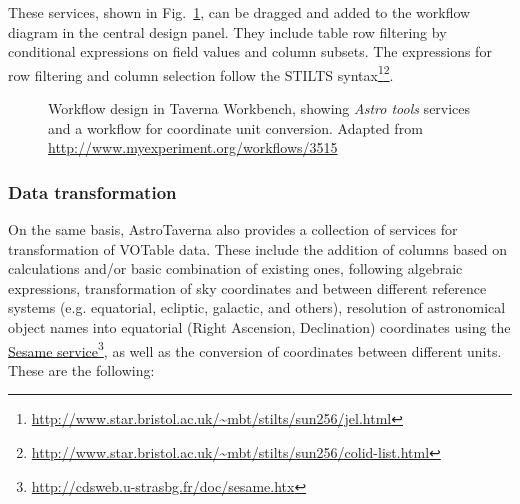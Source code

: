 \documentclass{aa}
\newcommand{\urlsamefont}[1]{\urlstyle{same}\url{#1}}
\newcommand{\hrefnote}[2]{\href{#1}{#2}\footnote{\urlsamefont{#1}}}
\begin{document}
These services, shown in Fig.~\ref{fig:design}, can be dragged and added to the workflow diagram in the central design panel. They include table row filtering by conditional expressions on field values and column subsets.  The expressions for row filtering and column selection follow the STILTS syntax\footnote{\urlsamefont{http://www.star.bristol.ac.uk/~mbt/stilts/sun256/jel.html}}\fnmsep\footnote{\urlsamefont{http://www.star.bristol.ac.uk/~mbt/stilts/sun256/colid-list.html}}.

\begin{figure}[tb]
\centering 
{}
\caption{Workflow design in Taverna Workbench, showing \textit{Astro tools} services and a workflow for coordinate unit conversion. Adapted from \url{http://www.myexperiment.org/workflows/3515}}
\label{fig:design}
\end{figure}

\subsubsection{Data transformation}
\label{DataTransformation}

On the same basis, AstroTaverna also provides a collection of services for transformation of VOTable data. These include the addition of columns based on calculations and/or basic combination of existing ones, following algebraic expressions, transformation of sky coordinates and between different reference systems (e.g. equatorial, ecliptic, galactic, and others), resolution of astronomical object names into equatorial (Right Ascension, Declination) coordinates using the \hrefnote{http://cdsweb.u-strasbg.fr/doc/sesame.htx}{Sesame service}, as well as the conversion of coordinates between different units. These are the following:
\end{document}
